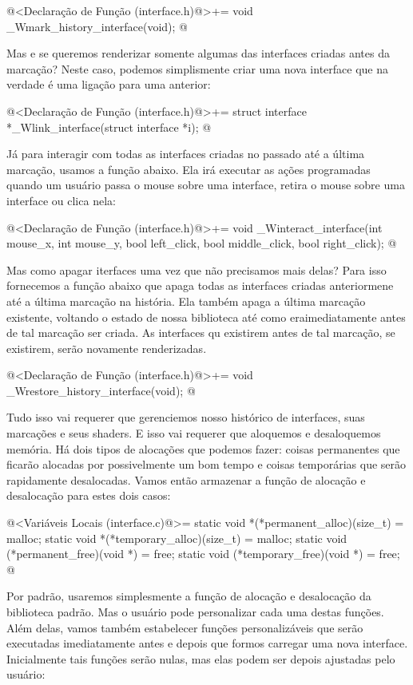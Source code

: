 \iniciocodigo
@<Declaração de Função (interface.h)@>+=
void _Wmark_history_interface(void);
@
\fimcodigo

Mas e se queremos renderizar somente algumas das interfaces criadas
antes da marcação? Neste caso, podemos simplismente criar uma nova
interface que na verdade é uma ligação para uma anterior:

\iniciocodigo
@<Declaração de Função (interface.h)@>+=
struct interface *_Wlink_interface(struct interface *i);
@
\fimcodigo

Já para interagir com todas as interfaces criadas no passado até a
última marcação, usamos a função abaixo. Ela irá executar as ações
programadas quando um usuário passa o mouse sobre uma interface,
retira o mouse sobre uma interface ou clica nela:

\iniciocodigo
@<Declaração de Função (interface.h)@>+=
void _Winteract_interface(int mouse_x, int mouse_y, bool left_click,
                          bool middle_click, bool right_click);
@
\fimcodigo


Mas como apagar iterfaces uma vez que não precisamos mais delas? Para
isso fornecemos a função abaixo que apaga todas as interfaces criadas
anteriormene até a última marcação na história. Ela também apaga a
última marcação existente, voltando o estado de nossa biblioteca até
como eraimediatamente antes de tal marcação ser criada. As interfaces
qu existirem antes de tal marcação, se existirem, serão novamente
renderizadas.

\iniciocodigo
@<Declaração de Função (interface.h)@>+=
void _Wrestore_history_interface(void);
@
\fimcodigo

Tudo isso vai requerer que gerenciemos nosso histórico de interfaces,
suas marcações e seus shaders. E isso vai requerer que aloquemos e
desaloquemos memória. Há dois tipos de alocações que podemos fazer:
coisas permanentes que ficarão alocadas por possivelmente um bom tempo
e coisas temporárias que serão rapidamente desalocadas. Vamos então
armazenar a função de alocação e desalocação para estes dois casos:

\iniciocodigo
@<Variáveis Locais (interface.c)@>=
static void *(*permanent_alloc)(size_t) = malloc;
static void *(*temporary_alloc)(size_t) = malloc;
static void (*permanent_free)(void *) = free;
static void (*temporary_free)(void *) = free;
@
\fimcodigo

Por padrão, usaremos simplesmente a função de alocação e desalocação
da biblioteca padrão. Mas o usuário pode personalizar cada uma destas
funções. Além delas, vamos também estabelecer funções personalizáveis
que serão executadas imediatamente antes e depois que formos carregar
uma nova interface. Inicialmente tais funções serão nulas, mas elas
podem ser depois ajustadas pelo usuário:

